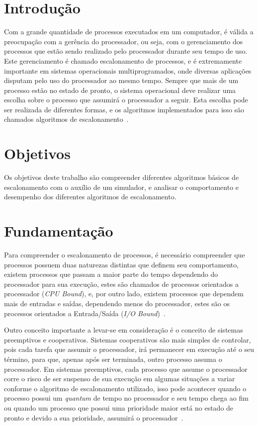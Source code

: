 \documentclass[
	12pt,				%
	oneside,   	        %
	a4paper,			%
	english,			%
	french,				%
	spanish,			%
	brazil,				%
	]{pacotes/abntex2}
\begin{document}
\section{Introdução}
\label{sec:introducao}
Com a grande quantidade de processos executados em um computador, é válida a preocupação com a gerência do processador, ou seja, com o gerenciamento dos processos que estão sendo realizado pelo processador durante seu tempo de uso. Este gerenciamento é chamado escalonamento de processos, e é extremamente importante em sistemas operacionais multiprogramados, onde diversas aplicações disputam pelo uso do processador ao mesmo tempo. Sempre que mais de um processo estão no estado de pronto, o sistema operacional deve realizar uma escolha sobre o processo que assumirá o processador a seguir. Esta escolha pode ser realizada de diferentes formas, e os algoritmos implementados para isso são chamados algoritmos de escalonamento~\cite{tanenbaum2016}.

\section{Objetivos}
\label{sec:objetivos}
Os objetivos deste trabalho são compreender diferentes algoritmos básicos de escalonamento com o auxílio de um simulador, e analisar o comportamento e desempenho dos diferentes algoritmos de escalonamento.

\section{Fundamentação}
\label{sec:fundamentacao}
Para compreender o escalonamento de processos, é necessário compreender que processos possuem duas naturezas distintas que definem seu comportamento, existem processos que passam a maior parte do tempo dependendo do processador para sua execução, estes são chamados de processos orientados a processador (\textit{CPU Bound}), e, por outro lado, existem processos que dependem mais de entradas e saídas, dependendo menos do processador, estes são os processos orientados a Entrada/Saída (\textit{I/O Bound})~\cite{tanenbaum2016}.

Outro conceito importante a levar-se em consideração é o conceito de sistemas preemptivos e cooperativos. Sistemas cooperativos são mais simples de controlar, pois cada tarefa que assumir o processador, irá permanecer em execução até o seu término, para que, apenas após ser terminada, outro processo assuma o processador. Em sistemas preemptivos, cada processo que assume o processador corre o risco de ser suspenso de sua execução em algumas situações a variar conforme o algoritmo de escalonamento utilizado, isso pode acontecer quando o processo possui um \textit{quantum} de tempo no processador e seu tempo chega ao fim ou quando um processo que possui uma prioridade maior está no estado de pronto e devido a sua prioridade, assumirá o processador~\cite{maziero2019}.
\end{document}

